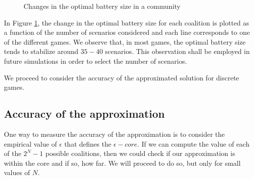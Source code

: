 \documentclass[sigconf, table]{acmart}
\begin{document}
\begin{figure}[]
\centering
{}
  \caption{Changes in the optimal battery size in a community}
  \label{fig:stoc_change}
\end{figure}


In Figure \ref{fig:stoc_change}, the change in the optimal battery size for each coalition is plotted as a function of the number of scenarios considered and each line corresponds to one of the different games.
We observe that, in most games, the optimal battery size tends to stabilize around $35-40$ scenarios. This observation shall be employed in future simulations in order to select the number of scenarios. 

We proceed to consider the accuracy of the approximated solution for discrete games.

\subsection{Accuracy of the approximation}

One way to measure the accuracy of the approximation is to consider the empirical value of $\epsilon$ that defines the $\epsilon-core$. If we can compute the value of each of the $2^N - 1$ possible coalitions, then we could check if our approximation is within the core and if so, how far. We will proceed to do so, but only for small values of $N$.
\end{document}
